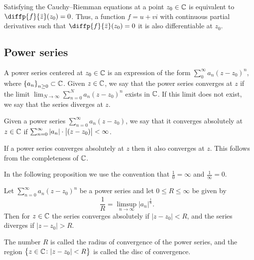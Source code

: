 \documentclass[11pt,a4paper]{article}
\begin{document}
\begin{remark}
  Satisfying the Cauchy--Riemman equations at a point $z_0 \in \mathbb{C}$ is
  equivalent to $\diffp{f}{{\bar z}}(z_0) = 0$.
  Thus, a function $f = u + v i$ with continuous partial derivatives
  such that $\diffp{f}{{\bar z}}(z_0) = 0$ it is also differentiable at
  $z_0$.
\end{remark}

\subsection{Power series}

\begin{definition}
  A power series centered at $z_0 \in \mathbb{C}$ is an expression of the
  form $\sum_{0}^{\infty} a_n (z - z_0)^n$,
  where $\left\{a_n\right\}_{n \geq 0} \subset \mathbb{C}$.
  Given $z \in \mathbb{C}$, we say that the power series converges at $z$ if
  the limit $\lim_{N \to \infty} \sum_{n=0}^{N} a_n (z - z_0)^n$ exists
  in $\mathbb{C}$.
  If this limit does not exist, we say that the series diverges at $z$.
\end{definition}

\begin{definition}
  Given a power series $\sum_{n=0}^{\infty} a_n (z - z_0)$,
  we say that it converges absolutely at $z \in \mathbb{C}$ if
  $\sum_{n=0}^{\infty} \left\lvert a_n\right\rvert \cdot \left\lvert(z - z_0)\right\rvert < \infty$.
\end{definition}

\begin{proposition}
  If a power series converges absolutely at $z$ then it also converges at $z$.
  This follows from the completeness of $\mathbb{C}$.
\end{proposition}

\begin{remark}
In the following proposition we use the convention that $\frac{1}{0} = \infty$
and $\frac{1}{\infty} = 0$.
\end{remark}

\begin{proposition}
  \label{thm:hadamard}
  Let $\sum_{n=0}^{\infty} a_n (z - z_0)^n$ be a power series
  and let $0 \le R \le \infty$ be given by
  \[
    \frac{1}{R} = \limsup_{n \to \infty} |a_n|^{\frac 1n}.
  \]
  Then for $z \in \mathbb{C}$ the series converges absolutely if $|z - z_0| < R$,
  and the series diverges if $|z - z_0| > R$.
\end{proposition}

\begin{remark}
  The number $R$ is called the radius of convergence of the power series,
  and the region $\left\{z \in \mathbb{C} \colon |z - z_0| < R\right\}$ is called the disc
  of convergence.
\end{remark}
\end{document}
